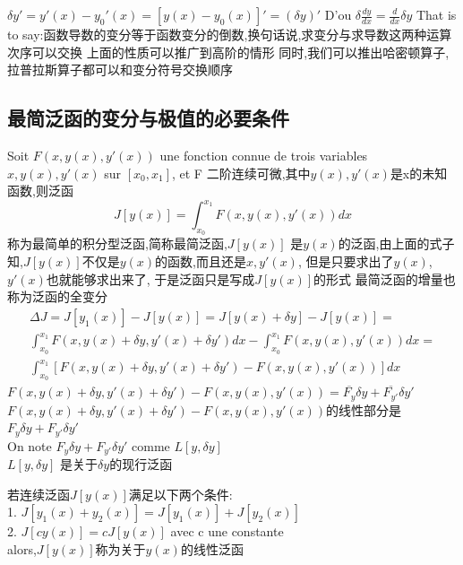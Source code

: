 \documentclass{article}
\begin{document}
$\delta y'=y'(x)-y_0'(x)=[y(x)-y_0(x)]'=(\delta y)'$
D'ou $\delta \frac{dy}{dx}=\frac{d}{dx}\delta y$
\newline
That is to say:函数导数的变分等于函数变分的倒数,换句话说,求变分与求导数这两种运算次序可以交换
\newline
上面的性质可以推广到高阶的情形
同时,我们可以推出哈密顿算子,拉普拉斯算子都可以和变分符号交换顺序

\subsection{最简泛函的变分与极值的必要条件}
Soit $F(x,y(x),y'(x))$ une fonction connue de trois variables $x,y(x),y'(x)$ sur $[x_0,x_1]$, et F 二阶连续可微,其中$y(x),y'(x)$是x的未知函数,则泛函 \newline
$$J[y(x)]=\int_{x_0}^{x_1}F(x,y(x),y'(x))dx$$
称为最简单的积分型泛函,简称最简泛函,$J[y(x)]$ 是$y(x)$的泛函,由上面的式子知,$J[y(x)]$不仅是$y(x)$的函数,而且还是$x,y'(x)$, 但是只要求出了$y(x)$, $y'(x)$也就能够求出来了, 于是泛函只是写成$J[y(x)]$的形式
\newline
最简泛函的增量也称为泛函的全变分
\begin{equation}
\begin{split}
  \Delta J=J[y_1(x)]-J[y(x)]=J[y(x)+\delta y]-J[y(x)]= \\
\int_{x_0}^{x_1}F(x,y(x)+\delta y,y'(x)+\delta y')dx-\int_{x_0}^{x_1}F(x,y(x),y'(x))dx = \\
\int_{x_0}^{x_1}[F(x,y(x)+\delta y,y'(x)+\delta y')-F(x,y(x),y'(x))]dx
 \end{split}
\end{equation}
$F(x,y(x)+\delta y,y'(x)+\delta y')-F(x,y(x),y'(x))=\overline{F_y}\delta y + \overline{F_{y'}}\delta y'$ \newline
$F(x,y(x)+\delta y,y'(x)+\delta y')-F(x,y(x),y'(x))$的线性部分是$F_y\delta y + F_{y'}\delta y'$ \\
On note $F_y\delta y + F_{y'}\delta y'$ comme $L[y,\delta y]$ \\
$L[y,\delta y]$ 是关于$\delta y$的现行泛函

\begin{definition}
若连续泛函$J[y(x)]$满足以下两个条件:\\
1. $J[y_1(x)+y_2(x)]=J[y_1(x)]+J[y_2(x)]$ \\
2. $J[cy(x)]=cJ[y(x)]$ avec c une constante\\
alors,$J[y(x)]$称为关于$y(x)$的线性泛函
\end{definition}
\end{document}
